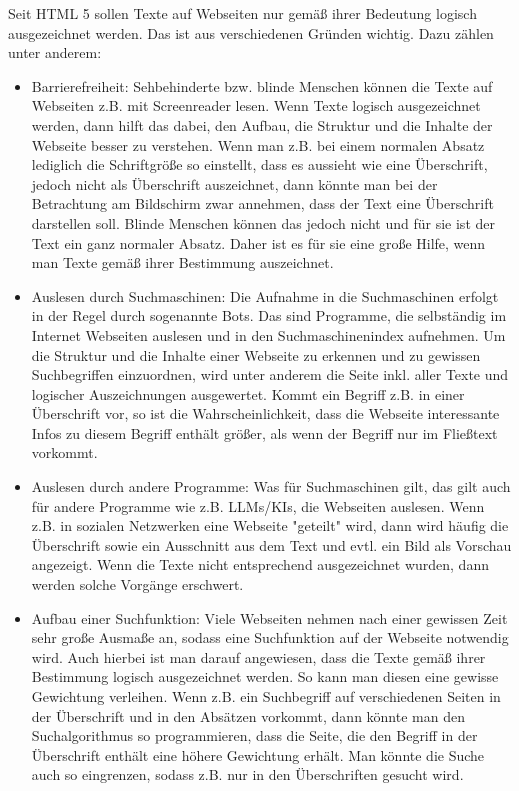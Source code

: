 Seit HTML 5 sollen Texte auf Webseiten nur gemäß ihrer Bedeutung logisch ausgezeichnet werden. Das ist aus verschiedenen Gründen wichtig. Dazu zählen unter anderem:
\begin{itemize}
    \item Barrierefreiheit: Sehbehinderte bzw. blinde Menschen können die Texte auf Webseiten z.B. mit Screenreader lesen. Wenn Texte logisch ausgezeichnet werden, dann hilft das dabei, den Aufbau, die Struktur und die Inhalte der Webseite besser zu verstehen. Wenn man z.B. bei einem normalen Absatz lediglich die Schriftgröße so einstellt, dass es aussieht wie eine Überschrift, jedoch nicht als Überschrift auszeichnet, dann könnte man bei der Betrachtung am Bildschirm zwar annehmen, dass der Text eine Überschrift darstellen soll. Blinde Menschen können das jedoch nicht und für sie ist der Text ein ganz normaler Absatz. Daher ist es für sie eine große Hilfe, wenn man Texte gemäß ihrer Bestimmung auszeichnet.
    \item Auslesen durch Suchmaschinen: Die Aufnahme in die Suchmaschinen erfolgt in der Regel durch sogenannte Bots. Das sind Programme, die selbständig im Internet Webseiten auslesen und in den Suchmaschinenindex aufnehmen. Um die Struktur und die Inhalte einer Webseite zu erkennen und zu gewissen Suchbegriffen einzuordnen, wird unter anderem die Seite inkl. aller Texte und logischer Auszeichnungen ausgewertet. Kommt ein Begriff z.B. in einer Überschrift vor, so ist die Wahrscheinlichkeit, dass die Webseite interessante Infos zu diesem Begriff enthält größer, als wenn der Begriff nur im Fließtext vorkommt.
    \item Auslesen durch andere Programme: Was für Suchmaschinen gilt, das gilt auch für andere Programme wie z.B. LLMs/KIs, die Webseiten auslesen. Wenn z.B. in sozialen Netzwerken eine Webseite "geteilt" wird, dann wird häufig die Überschrift sowie ein Ausschnitt aus dem Text und evtl. ein Bild als Vorschau angezeigt. Wenn die Texte nicht entsprechend ausgezeichnet wurden, dann werden solche Vorgänge erschwert.
    \item Aufbau einer Suchfunktion: Viele Webseiten nehmen nach einer gewissen Zeit sehr große Ausmaße an, sodass eine Suchfunktion auf der Webseite notwendig wird. Auch hierbei ist man darauf angewiesen, dass die Texte gemäß ihrer Bestimmung logisch ausgezeichnet werden. So kann man diesen eine gewisse Gewichtung verleihen. Wenn z.B. ein Suchbegriff auf verschiedenen Seiten in der Überschrift und in den Absätzen vorkommt, dann könnte man den Suchalgorithmus so programmieren, dass die Seite, die den Begriff in der Überschrift enthält eine höhere Gewichtung erhält. Man könnte die Suche auch so eingrenzen, sodass z.B. nur in den Überschriften gesucht wird.
\end{itemize}
